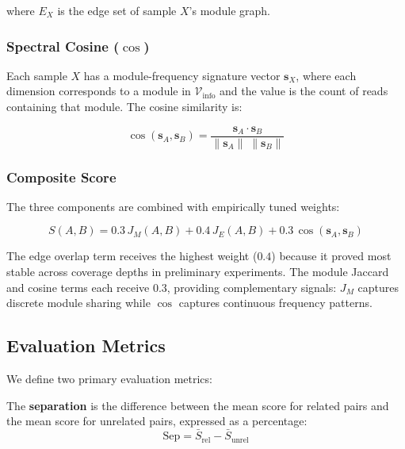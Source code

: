 \documentclass{../yalumba}
\begin{document}
\noindent where $E_X$ is the edge set of sample $X$'s module graph.

\subsubsection{Spectral Cosine ($\cos$)}

Each sample $X$ has a module-frequency signature vector $\mathbf{s}_X$, where
each dimension corresponds to a module in $\mathcal{V}_{\text{info}}$ and the
value is the count of reads containing that module.  The cosine similarity is:

\begin{equation}
  \cos(\mathbf{s}_A, \mathbf{s}_B)
    = \frac{\mathbf{s}_A \cdot \mathbf{s}_B}
           {\|\mathbf{s}_A\| \; \|\mathbf{s}_B\|}
  \label{eq:cosine}
\end{equation}

\subsubsection{Composite Score}

The three components are combined with empirically tuned weights:

\begin{equation}
  S(A, B) = 0.3 \, J_M(A,B) + 0.4 \, J_E(A,B) + 0.3 \, \cos(\mathbf{s}_A, \mathbf{s}_B)
  \label{eq:combined}
\end{equation}

\noindent The edge overlap term receives the highest weight ($0.4$) because it
proved most stable across coverage depths in preliminary experiments.  The
module Jaccard and cosine terms each receive $0.3$, providing complementary
signals: $J_M$ captures discrete module sharing while $\cos$ captures
continuous frequency patterns.

\subsection{Evaluation Metrics}

We define two primary evaluation metrics:

\begin{definition}
The \textbf{separation} is the difference between the mean score for related
pairs and the mean score for unrelated pairs, expressed as a percentage:
\begin{equation}
  \text{Sep} = \bar{S}_{\text{rel}} - \bar{S}_{\text{unrel}}
  \label{eq:separation}
\end{equation}
\end{definition}
\end{document}
